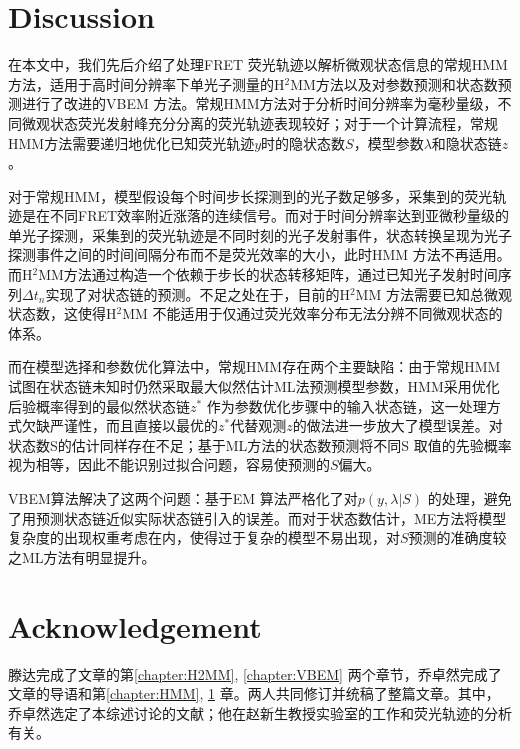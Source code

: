 \documentclass[11pt, a4paper]{article}
\begin{document}
\section{Discussion}\label{chapter:Discussion}
在本文中，我们先后介绍了处理FRET 荧光轨迹以解析微观状态信息的常规HMM方法，适用于高时间分辨率下单光子测量的H$^2$MM方法以及对参数预测和状态数预测进行了改进的VBEM 方法。常规HMM方法对于分析时间分辨率为毫秒量级，不同微观状态荧光发射峰充分分离的荧光轨迹表现较好；对于一个计算流程，常规HMM方法需要递归地优化已知荧光轨迹$y$时的隐状态数$S$，模型参数$\lambda$和隐状态链$z$。

对于常规HMM，模型假设每个时间步长探测到的光子数足够多，采集到的荧光轨迹是在不同FRET效率附近涨落的连续信号。而对于时间分辨率达到亚微秒量级的单光子探测，采集到的荧光轨迹是不同时刻的光子发射事件，状态转换呈现为光子探测事件之间的时间间隔分布而不是荧光效率的大小，此时HMM 方法不再适用。而H$^2$MM方法通过构造一个依赖于步长的状态转移矩阵，通过已知光子发射时间序列$\Delta t_n$实现了对状态链的预测。不足之处在于，目前的H$^2$MM 方法需要已知总微观状态数，这使得H$^2$MM 不能适用于仅通过荧光效率分布无法分辨不同微观状态的体系。

而在模型选择和参数优化算法中，常规HMM存在两个主要缺陷：由于常规HMM 试图在状态链未知时仍然采取最大似然估计ML法预测模型参数，HMM采用优化后验概率得到的最似然状态链$z^*$ 作为参数优化步骤中的输入状态链，这一处理方式欠缺严谨性，而且直接以最优的$z^*$代替观测$z$的做法进一步放大了模型误差。对状态数S的估计同样存在不足；基于ML方法的状态数预测将不同S 取值的先验概率视为相等，因此不能识别过拟合问题，容易使预测的$S$偏大。

VBEM算法解决了这两个问题：基于EM 算法严格化了对$p(y,\lambda|S)$ 的处理，避免了用预测状态链近似实际状态链引入的误差。而对于状态数估计，ME方法将模型复杂度的出现权重考虑在内，使得过于复杂的模型不易出现，对$S$预测的准确度较之ML方法有明显提升。


\section{Acknowledgement}
    滕达完成了文章的第\ref{chapter:H2MM}, \ref{chapter:VBEM} 两个章节，乔卓然完成了文章的导语和第\ref{chapter:HMM}, \ref{chapter:Discussion} 章。两人共同修订并统稿了整篇文章。其中，乔卓然选定了本综述讨论的文献；他在赵新生教授实验室的工作和荧光轨迹的分析有关。


\small


\end{document}
